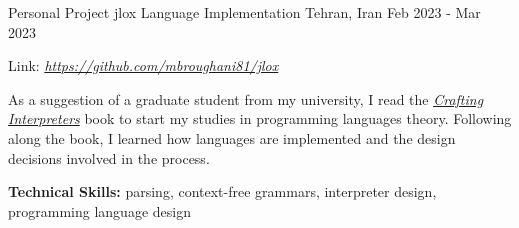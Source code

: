 

\begin{cventries}


  \cventry
  {Personal Project} %
  {jlox Language Implementation} %
  {Tehran, Iran} %
  {Feb 2023 - Mar 2023} %
  {
    \begin{cvitems} %
    \item {Link: \href{https://github.com/mbroughani81/jlox}{\textit{https://github.com/mbroughani81/jlox}}}
    \item {As a suggestion of a graduate student from my university, I read the
        \href{https://craftinginterpreters.com/}{\textit{Crafting Interpreters}}
        book to start my studies in programming languages theory. Following along the book, I learned how languages are implemented and the design decisions involved in the process.}
    \item {\textbf{Technical Skills:} parsing, context-free grammars, interpreter design, programming language design}
    \end{cvitems}
  }


\end{cventries}
